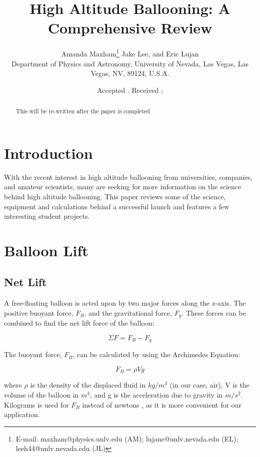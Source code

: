\documentclass[usenatbib]{mn2e}
\title[]{High Altitude Ballooning: A Comprehensive Review}
\author[Amanda Maxham, etc.]{Amanda Maxham\thanks{E-mail:
maxham@physics.unlv.edu (AM); lujane@unlv.nevada.edu (EL); leeh44@unlv.nevada.edu (JL)} Jake Lee, and Eric Lujan\\
Department of Physics and Astronomy, University of Nevada, Las Vegas, Las Vegas, NV, 89124, U.S.A.}
\begin{document}
\date{Accepted . Received ; }

\pagerange{\pageref{firstpage}--\pageref{lastpage}} 

\maketitle

\label{firstpage}
\begin{abstract}
This will be re-written after the paper is completed
\end{abstract}
\section{Introduction}
With the recent interest in high altitude ballooning from universities, companies, and amateur scientists, many are seeking for more information on the science behind high altitude ballooning. This paper reviews some of the science, equipment and calculations behind  a successful launch and features a few interesting student projects.

\section{Balloon Lift}

\subsection{Net Lift}

A free-floating balloon is acted upon by two major forces along the z-axis. The positive buoyant force, $F_B$, and the gravitational force, $F_g$. These forces can be combined to find the net lift force of the balloon:

\begin{equation}
\Sigma F= F_B - F_g
\end{equation}

The buoyant force, $F_B$, can be calculated by using the Archimedes Equation:

\begin{equation}
F_{B} = \rho V g
\end{equation}

where $\rho$ is the density of the displaced fluid in $kg/m^3$ (in our case, air), V is the volume of the balloon in $m^3$, and g is the acceleration due to gravity in $m/s^2$. Kilograms is used for $F_{B}$ instead of newtons , as it is more convenient for our application.
\end{document}
